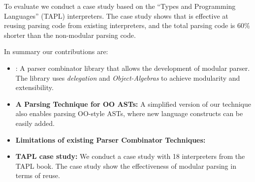   To evaluate \name we conduct a case study based on the ``Types and
  Programming Languages'' (TAPL) interpreters.  The case study shows
  that \name is effective at reusing parsing code from existing
  interpreters, and the total parsing code is 60\% shorter than the
  non-modular parsing code.

In summary our contributions are:

\begin{itemize}

\item {\name:} A parser combinator library that allows the development 
of modular parser. The library uses \emph{delegation} and
\emph{Object-Algebras} to achieve modularity and extensibility.

\item {{\bf A Parsing Technique for OO ASTs:}} A simplified version of
  our technique also enables parsing OO-style ASTs, where new language
  constructs can be easily added.

\item {{\bf Limitations of existing Parser Combinator Techniques:}}

\item {{\bf TAPL case study:}} We conduct a case study with 18 interpreters
  from the TAPL book. The case study show the effectiveness of modular 
  parsing in terms of reuse.

\end{itemize}



